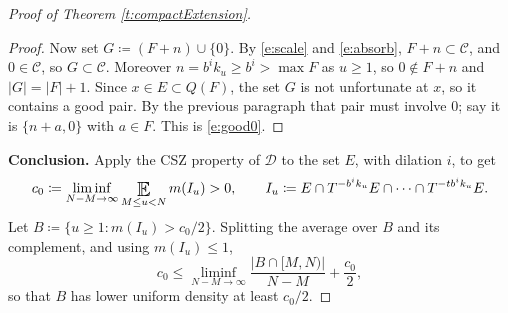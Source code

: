 \begin{proof}[Proof of Theorem \ref{t:compactExtension}]
\begin{proof}
Now set $G \coloneqq (F+n) \cup \{0\}$.  By \eqref{e:scale} and \eqref{e:absorb}, $F + n \subset \mathcal C$, and $0 \in \mathcal C$, so $G \subset \mathcal C$.  
Moreover $n = b ^{i}k_u \geq b ^{i} > \max F$ as $u \geq 1$, so $0 \notin F+n$ and $\lvert G\rvert = \lvert F\rvert +1$.  
Since $x \in E \subset Q(F)$, the set $G$ is not unfortunate at $x$, so it contains a good pair.  By the previous paragraph that pair must involve $0$; 
say it is $\{n+a, 0\}$ with $a \in F$.  This is \eqref{e:good0}. 
\end{proof}

\smallskip 
\noindent \textbf{Conclusion.}  
Apply the CSZ property of $\mathcal D$ to the set $E$, with dilation $i$, to get  
\begin{equation} \label{e:c0}
c_0 \coloneqq \liminf_{N-M\to\infty}  \Expectation_{M\leq u<N} m (I_u)>0 , 
\qquad I_u \coloneqq E \cap T ^{-b ^{i}k_u}E \cap \cdots \cap T ^{-tb ^{i}k_u}E . 
\end{equation}
Let $B \coloneqq \{u \geq 1\colon m (I_u) > c_0/2\}$.  Splitting the average over $B$ and its complement, and using $m(I_u) \leq 1$, 
\begin{equation}
c_0 \leq \liminf_{N-M\to\infty} \frac{\lvert B \cap [M,N) \rvert}{N-M} + \frac {c_0}2 , 
\end{equation}
so that $B$ has lower uniform density at least $c_0/2$.  


\end{proof}
